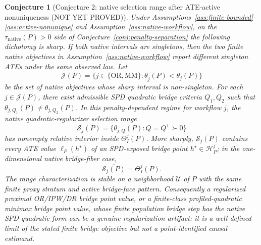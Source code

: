 \documentclass[11pt]{article}
\newcommand{\transpose}{\mathsf{T}}
\newcommand{\calH}{\mathcal{H}}
\theoremstyle{definition}
\theoremstyle{plain}
\newtheorem{conjecture}{Conjecture}
\theoremstyle{remark}
\begin{document}
\begin{conjecture}[Conjecture 2: native selection range after ATE-active nonuniqueness (NOT YET PROVED)]\label{conj:selection-range}
Under Assumptions~\ref{ass:finite-bounded}--\ref{ass:active-nonunique} and
Assumption~\ref{ass:native-workflow}, on the
\(\tau_{\mathrm{native}}(P)>0\) side of
Conjecture~\ref{conj:penalty-separation} the following dichotomy is sharp.
If both native intervals are singletons, then the two finite native
objectives in Assumption~\ref{ass:native-workflow} report different
singleton ATEs under the same observed law.  Let
\[
\mathcal J(P)=\{j\in\{\mathrm{OR},\mathrm{MM}\}:
\underline\theta_j(P)<\overline\theta_j(P)\}
\]
be the set of native objectives whose sharp interval is non-singleton.  For
each \(j\in\mathcal J(P)\), there exist admissible SPD quadratic bridge
criteria \(Q_1,Q_2\) such that
\(\theta_{j,Q_1}(P)\neq\theta_{j,Q_2}(P)\).  In this penalty-dependent
regime for workflow \(j\), the native quadratic-regularizer selection range
\[
\mathcal S_j(P)=\{\theta_{j,Q}(P):Q=Q^\transpose\succ0\}
\]
has nonempty relative interior inside \(\Theta_I^j(P)\).  More sharply,
\(\overline{\mathcal S_j(P)}\) contains every ATE value \(\ell_P(h^\star)\)
of an SPD-exposed bridge point \(h^\star\in\calH_P^j\); in the
one-dimensional native bridge-fiber case,
\[
\overline{\mathcal S_j(P)}=\Theta_I^j(P).
\]
The range characterization is stable on a neighborhood \(\mathcal U\) of
\(P\) with the same finite proxy stratum and active bridge-face pattern.
Consequently a regularized proximal OR/IPW/DR bridge point value, or a
finite-class profiled-quadratic minimax bridge point value, whose finite
population bridge step has the native SPD-quadratic form can be a genuine
regularization artifact: it is a well-defined limit of the stated finite
bridge objective but not a point-identified causal estimand.
\end{conjecture}
\end{document}

